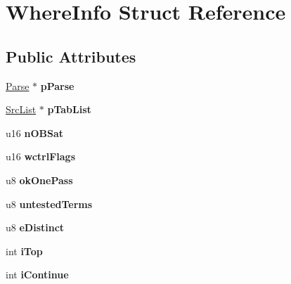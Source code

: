 \hypertarget{struct_where_info}{\section{Where\-Info Struct Reference}
\label{struct_where_info}
}
\subsection*{Public Attributes}
\begin{DoxyCompactItemize}
\item 
\hypertarget{struct_where_info_a26745055cd13360536fb4b074db358f9}{\hyperlink{struct_parse}{Parse} $\ast$ {\bfseries p\-Parse}}\label{struct_where_info_a26745055cd13360536fb4b074db358f9}

\item 
\hypertarget{struct_where_info_a0f43432aeca75640c96a69f6a82aa138}{\hyperlink{struct_src_list}{Src\-List} $\ast$ {\bfseries p\-Tab\-List}}\label{struct_where_info_a0f43432aeca75640c96a69f6a82aa138}

\item 
\hypertarget{struct_where_info_a78cb5a31de5965a54f7cb5f2089024d2}{u16 {\bfseries n\-O\-B\-Sat}}\label{struct_where_info_a78cb5a31de5965a54f7cb5f2089024d2}

\item 
\hypertarget{struct_where_info_a85ac59be7be01c6b08f8b225585d27e0}{u16 {\bfseries wctrl\-Flags}}\label{struct_where_info_a85ac59be7be01c6b08f8b225585d27e0}

\item 
\hypertarget{struct_where_info_a851aa1747f940f6ab58505f9326fe9c7}{u8 {\bfseries ok\-One\-Pass}}\label{struct_where_info_a851aa1747f940f6ab58505f9326fe9c7}

\item 
\hypertarget{struct_where_info_a4f925cad7a0a9ff977eef944969673d8}{u8 {\bfseries untested\-Terms}}\label{struct_where_info_a4f925cad7a0a9ff977eef944969673d8}

\item 
\hypertarget{struct_where_info_a3dd0b1738e0e2fbf5ab61c00939ab532}{u8 {\bfseries e\-Distinct}}\label{struct_where_info_a3dd0b1738e0e2fbf5ab61c00939ab532}

\item 
\hypertarget{struct_where_info_a4edc0a92a162cbe63ac8f52e923fb038}{int {\bfseries i\-Top}}\label{struct_where_info_a4edc0a92a162cbe63ac8f52e923fb038}

\item 
\hypertarget{struct_where_info_a5b8eb73a6a5bba7ef126b9de13ee8537}{int {\bfseries i\-Continue}}\label{struct_where_info_a5b8eb73a6a5bba7ef126b9de13ee8537}


\end{DoxyCompactItemize}
